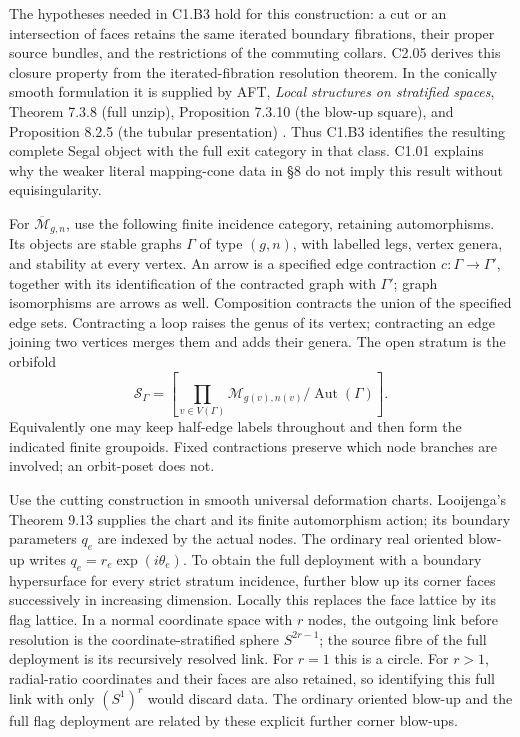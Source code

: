 The hypotheses needed in C1.B3 hold for this construction: a cut or an intersection of faces retains the same iterated boundary fibrations, their proper source bundles, and the restrictions of the commuting collars. C2.05 derives this closure property from the iterated-fibration resolution theorem. In the conically smooth formulation it is supplied by AFT, \emph{Local structures on stratified spaces}, Theorem 7.3.8 (full unzip), Proposition 7.3.10 (the blow-up square), and Proposition 8.2.5 (the tubular presentation) \cite{C_AFT}. Thus C1.B3 identifies the resulting complete Segal object with the full exit category in that class. C1.01 explains why the weaker literal mapping-cone data in \S{}8 do not imply this result without equisingularity.

For \(\overline{\mathcal M}_{g,n}\), use the following finite incidence category, retaining automorphisms. Its objects are stable graphs \(\Gamma\) of type \((g,n)\), with labelled legs, vertex genera, and stability at every vertex. An arrow is a specified edge contraction \(c:\Gamma\to\Gamma'\), together with its identification of the contracted graph with \(\Gamma'\); graph isomorphisms are arrows as well. Composition contracts the union of the specified edge sets. Contracting a loop raises the genus of its vertex; contracting an edge joining two vertices merges them and adds their genera. The open stratum is the orbifold \[
 \mathcal S_\Gamma=
 \left[\prod_{v\in V(\Gamma)}\mathcal M_{g(v),n(v)}
          \big/\operatorname{Aut}(\Gamma)\right].
\] Equivalently one may keep half-edge labels throughout and then form the indicated finite groupoids. Fixed contractions preserve which node branches are involved; an orbit-poset does not.

Use the cutting construction in smooth universal deformation charts. Looijenga's Theorem 9.13 \cite{C_Looijenga} supplies the chart and its finite automorphism action; its boundary parameters \(q_e\) are indexed by the actual nodes. The ordinary real oriented blow-up writes \(q_e=r_e\exp(i\theta_e)\). To obtain the full deployment with a boundary hypersurface for every strict stratum incidence, further blow up its corner faces successively in increasing dimension. Locally this replaces the face lattice by its flag lattice. In a normal coordinate space with \(r\) nodes, the outgoing link before resolution is the coordinate-stratified sphere \(S^{2r-1}\); the source fibre of the full deployment is its recursively resolved link. For \(r=1\) this is a circle. For \(r>1\), radial-ratio coordinates and their faces are also retained, so identifying this full link with only \((S^1)^r\) would discard data. The ordinary oriented blow-up and the full flag deployment are related by these explicit further corner blow-ups.

